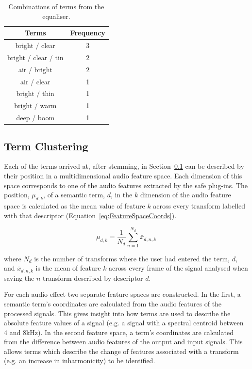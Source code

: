 		\begin{table}[h!]
			\centering
			\begin{tabular}{|c|c|}
				\hline
				\bf{Terms} & \bf{Frequency} \tabularnewline
				\hline
				\hline
				bright / clear & 3 \tabularnewline
				\hline
				bright / clear / tin & 2 \tabularnewline
				\hline
				air / bright & 2 \tabularnewline
				\hline
				air / clear & 1 \tabularnewline
				\hline
				bright / thin & 1 \tabularnewline
				\hline
				bright / warm & 1 \tabularnewline
				\hline
				deep / boom & 1 \tabularnewline
				\hline
			\end{tabular}
			\caption{Combinations of terms from the equaliser.}
			\label{tab:EqualiserTermCombinations}
		\end{table}
		
	\subsection{Term Clustering}
	\label{sec:TimbreEvaluation-Analysis-TermClustering}
		Each of the terms arrived at, after stemming, in Section~\ref{sec:TimbreEvaluation-Analysis-TermClustering}
		can be described by their position in a multidimensional audio feature space. Each dimension of this space
		corresponds to one of the audio features extracted by the \acrshort{safe} plug-ins. The position,
		$\mu_{d,k}$, of a semantic term, $d$, in the $k$ dimension of the audio feature space is
		calculated as the mean value of feature $k$ across every transform labelled with that descriptor
		(Equation~\ref{eq:FeatureSpaceCoords}).

		\begin{equation}
			\mu_{d,k} = \frac{1}{N_{d}} \sum_{n = 1}^{N_{d}} \bar{x}_{d,n,k}
			\label{eq:FeatureSpaceCoords}
		\end{equation}

		where $N_{d}$ is the number of transforms where the user had entered the term, $d$, and $\bar{x}_{d,n,k}$
		is the mean of feature $k$ across every frame of the signal analysed when saving the $n$
		transform described by descriptor $d$.
		
		For each audio effect two separate feature spaces are constructed. In the first, a semantic term's
		coordinates are calculated from the audio features of the processed signals. This gives insight into how
		terms are used to describe the absolute feature values of a signal (e.g. a signal with a spectral centroid
		between 4 and 8kHz). In the second feature space, a term's coordinates are calculated from the difference
		between audio features of the output and input signals. This allows terms which describe the change of
		features associated with a transform (e.g. an increase in inharmonicity) to be identified.

